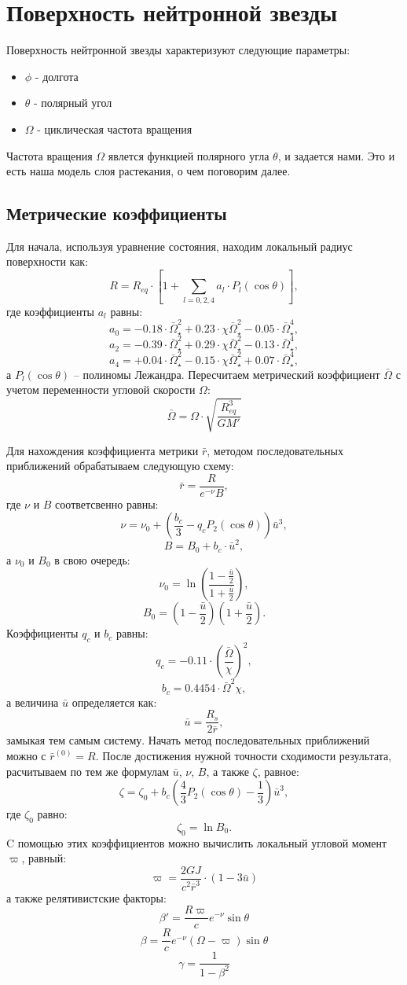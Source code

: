 \section{Поверхность нейтронной звезды}
Поверхность нейтронной звезды характеризуют следующие параметры:
\begin{itemize}
    \item $\phi$ - долгота
    \item $\theta$ - полярный угол
    \item $\Omega$ - циклическая частота вращения 
\end{itemize}
Частота вращения $\Omega$ явлется функцией полярного угла $\theta$, и задается нами. Это и есть наша модель слоя растекания, о чем поговорим далее.
\subsection{Метрические коэффициенты}
Для начала, используя уравнение состояния, находим локальный радиус поверхности как:
$$R = R_{eq} \cdot \left[1 + \sum_{l=0,2,4} a_l \cdot P_l(\cos\theta) \right],$$
где коэффициенты $a_l$ равны:
$$a_0 = -0.18 \cdot \bar{\Omega}_{\star}^2 + 0.23 \cdot \chi \bar{\Omega}_{\star}^2 - 0.05 \cdot \bar{\Omega}_{\star}^4,$$
$$a_2 = -0.39 \cdot \bar{\Omega}_{\star}^2 + 0.29 \cdot \chi \bar{\Omega}_{\star}^2 - 0.13 \cdot \bar{\Omega}_{\star}^4,$$
$$a_4 = +0.04 \cdot \bar{\Omega}_{\star}^2 - 0.15 \cdot \chi \bar{\Omega}_{\star}^2 + 0.07 \cdot \bar{\Omega}_{\star}^4,$$
а $P_l(\cos\theta)$ -- полиномы Лежандра. Пересчитаем метрический коэффициент $\bar{\Omega}$ с учетом переменности угловой скорости $\Omega$:
$$\bar{\Omega} =  \Omega \cdot \sqrt{\frac{R_{eq}^3}{G M'}}$$

Для нахождения коэффициента метрики $\bar{r}$, методом последовательных приближений обрабатываем следующую схему:
$$\bar{r} = \frac{R}{e^{-\nu} B},$$
где $\nu$ и $B$ соответсвенно равны:
$$\nu = \nu_0 + \left(\frac{b_c}{3} - q_c P_2(\cos \theta)\right)\bar{u}^3 ,$$
$$B = B_0 + b_c \cdot \bar{u}^2 ,$$
а $\nu_0$ и $B_0$ в свою очередь:
$$\nu_0 = \ln \left(\frac{1 - \frac{\bar{u}}{2}}{1 + \frac{\bar{u}}{2}} \right) ,$$
$$B_0 = \left(1 - \frac{\bar{u}}{2}\right) \left(1 + \frac{\bar{u}}{2}\right).$$
Коэффициенты $q_c$ и $b_c$ равны:
$$q_c = -0.11 \cdot \left(\frac{\bar{\Omega}}{\chi}\right)^2,$$
$$b_c = 0.4454 \cdot \bar{\Omega}^2  \chi,$$
а величина $\bar{u}$ определяется как:
$$\bar{u} =  \frac{R_s}{2\bar{r}},$$
замыкая тем самым систему. Начать метод последовательных приближений можно с $\bar{r}^{(0)} = R$. 
После достижения нужной точности сходимости результата, расчитываем по тем же формулам $\bar{u}$, $\nu$, $B$, а также $\zeta$, равное:
$$\zeta = \zeta_0 + b_c\left( \frac{4}{3} P_2(\cos \theta) - \frac{1}{3} \right)\bar{u}^3,$$
где $\zeta_0$ равно:
$$\zeta_0 = \ln B_0.$$ 
C помощью этих коэффициентов можно вычислить локальный угловой момент $\varpi$, равный:
$$\varpi = \frac{2GJ}{c^2  \bar{r}^3} \cdot (1 - 3 \bar{u})$$
а также релятивистские факторы:
$$\beta' =  \frac{R \varpi}{c} e^{-\nu}  \sin \theta $$
$$\beta =  \frac{R}{c} e^{-\nu} (\Omega - \varpi) \sin \theta $$
$$\gamma = \frac{1}{1 - \beta^2}$$


